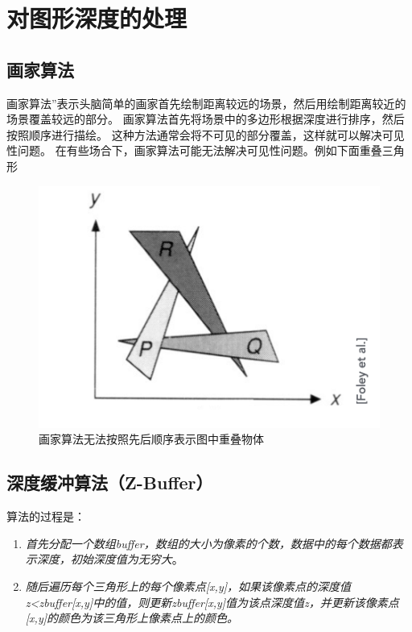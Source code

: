 \section{对图形深度的处理}

\subsection*{画家算法}

画家算法”表示头脑简单的画家首先绘制距离较远的场景，然后用绘制距离较近的场景覆盖较远的部分。 画家算法首先将场景中的多边形根据深度进行排序，然后按照顺序进行描绘。 这种方法通常会将不可见的部分覆盖，这样就可以解决可见性问题。 
在有些场合下，画家算法可能无法解决可见性问题。例如下面重叠三角形

\begin{figure}[H]
    \centering
    \includegraphics[scale=0.6]{figures/画家算法.png}
    \caption[short]{画家算法无法按照先后顺序表示图中重叠物体}
\end{figure}

\subsection*{深度缓冲算法（Z-Buffer）}

算法的过程是：

\begin{enumerate}[itemindent=2em]
    \item \textsl{首先分配一个数组buffer，数组的大小为像素的个数，数据中的每个数据都表示深度，初始深度值为无穷大}。
    \item \textsl{随后遍历每个三角形上的每个像素点[x,y]，如果该像素点的深度值z<zbuffer[x,y]中的值，则更新zbuffer[x,y]值为该点深度值z，并更新该像素点[x,y]的颜色为该三角形上像素点上的颜色。}
\end{enumerate}

